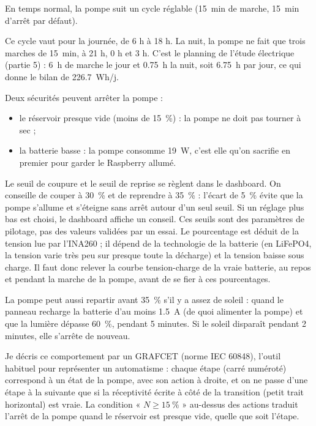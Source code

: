 En temps normal, la pompe suit un cycle réglable (\qty{15}{min} de marche, \qty{15}{min} d'arrêt par défaut).

Ce cycle vaut pour la journée, de 6 h à 18 h. La nuit, la pompe ne fait que trois marches de \qty{15}{min}, à 21 h, 0 h et 3 h. C'est le planning de l'étude électrique (partie 5) : \qty{6}{h} de marche le jour et \qty{0,75}{h} la nuit, soit \qty{6,75}{h} par jour, ce qui donne le bilan de \qty{226,7}{Wh/j}.

Deux sécurités peuvent arrêter la pompe :

\begin{itemize}
\item le réservoir presque vide (moins de \qty{15}{\percent}) : la pompe ne doit pas tourner à sec ;
\item la batterie basse : la pompe consomme \qty{19}{W}, c'est elle qu'on sacrifie en premier pour garder le Raspberry allumé.
\end{itemize}

Le seuil de coupure et le seuil de reprise se règlent dans le dashboard. On conseille de couper à \qty{30}{\percent} et de reprendre à \qty{35}{\percent} : l'écart de \qty{5}{\percent} évite que la pompe s'allume et s'éteigne sans arrêt autour d'un seul seuil. Si un réglage plus bas est choisi, le dashboard affiche un conseil. Ces seuils sont des paramètres de pilotage, pas des valeurs validées par un essai. Le pourcentage est déduit de la tension lue par l'INA260 ; il dépend de la technologie de la batterie (en LiFePO4, la tension varie très peu sur presque toute la décharge) et la tension baisse sous charge. Il faut donc relever la courbe tension-charge de la vraie batterie, au repos et pendant la marche de la pompe, avant de se fier à ces pourcentages.

La pompe peut aussi repartir avant \qty{35}{\percent} s'il y a assez de soleil : quand le panneau recharge la batterie d'au moins \qty{1,5}{A} (de quoi alimenter la pompe) et que la lumière dépasse \qty{60}{\percent}, pendant 5 minutes. Si le soleil disparaît pendant 2 minutes, elle s'arrête de nouveau.

Je décris ce comportement par un GRAFCET (norme IEC 60848), l'outil habituel pour représenter un automatisme : chaque étape (carré numéroté) correspond à un état de la pompe, avec son action à droite, et on ne passe d'une étape à la suivante que si la réceptivité écrite à côté de la transition (petit trait horizontal) est vraie. La condition « $N \geq \qty{15}{\percent}$ » au-dessus des actions traduit l'arrêt de la pompe quand le réservoir est presque vide, quelle que soit l'étape.

